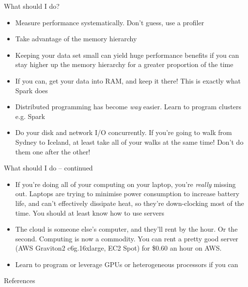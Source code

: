\documentclass{beamer}
\begin{document}
\begin{frame}{What should I do?}
	\begin{itemize}
		\item Measure performance systematically. Don't guess, use a profiler
		
		\item Take advantage of the memory hierarchy

		\item Keeping your data set small can yield huge performance benefits
		if you can stay higher up the memory hierarchy for a greater proportion
		of the time

		\item If you can, get your data into RAM, and keep it there! This is exactly what
		Spark does

		\item Distributed programming has become \emph{way} easier. Learn to program
		clusters e.g. Spark

		\item Do your disk and network I/O concurrently. If you're going to walk
		from Sydney to Iceland, at least take all of your walks at the same time!
		Don't do them one after the other!

	\end{itemize}
\end{frame}

\begin{frame}{What should I do -- continued}
	\begin{itemize}
		\item If you're doing all of your computing on your laptop, you're \emph{really}
		missing out. Laptops are trying to minimise power consumption to increase battery life, and
		can't effectively dissipate heat, so they're down-clocking most of the time.
		You should at least know how to use servers

		\item The cloud is someone else's computer, and they'll rent by the
		hour. Or the second. Computing is now a commodity. You can rent a pretty
		good server (AWS Graviton2 c6g.16xlarge, EC2 Spot) for \$0.60 an hour on
		AWS. 

		\item Learn to program or leverage GPUs or heterogeneous processors if you can
		
	\end{itemize}
\end{frame}

\begin{frame}{References}


\end{frame}
\end{document}
